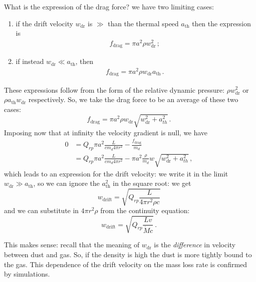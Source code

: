 \documentclass[main.tex]{subfiles}
\begin{document}
What is the expression of the drag force? we have two limiting cases: 
\begin{enumerate}
    \item if the drift velocity \(w _{\text{dr}}\) is \(\gg \) than the thermal speed \(a _{\text{th}}\) then the expression is 
    \begin{align}
    f _{\text{drag}} = \pi a^2 \rho w _{\text{dr}}^2
    \,;
    \end{align}
    \item if instead \(w _{\text{dr}} \ll a _{\text{th}}\), then 
    \begin{align}
    f _{\text{drag}}
    = \pi a^2 \rho w _{\text{dr}} a _{\text{th}}
    \,.
    \end{align}
\end{enumerate}

These expressions follow from the form of the relative dynamic pressure: \(\rho w^2 _{\text{dr}} \) or \(\rho a _{\text{th}} w _{\text{dr}}\) respectively.
So, we take the drag force to be an average of these two cases: 
%
\begin{equation}
f_{\text{drag}}=\pi a^2\rho w _{\text{dr}} \sqrt{w_{\text{dr}}^2+a_{th}^2}
\,.
\end{equation}
Imposing now that at infinity the velocity gradient is null, we have
\begin{align}
0&=Q_{rp}\pi a^2 \frac{L}{c m_d 4\pi r^2}-\frac{f_{\text{drag}}}{m_d} \\
&= Q_{rp}\pi a^2 \frac{L}{c m_d 4\pi r^2}
- \pi a^2 \frac{\rho}{m_d} w \sqrt{w_{\text{dr}}^2+a_{th}^2} \,,
\end{align}
%
which leads to an expression for the drift velocity: we write it in the limit \(w _{\text{dr}} \gg a _{\text{th}}\), so we can ignore the \(a^2 _{\text{th}}\) in the square root: we get
%
\begin{equation}
w_{\text{drift}}=\sqrt{Q_{rp}\frac{L}{4\pi r^2\rho c}}
\end{equation}
%
and we can substitute in \(4 \pi r^2 \rho \) from the continuity equation:
%
\begin{equation}
w_{\text{drift}}=\sqrt{Q_{rp}\frac{L v}{\dot M c}}\,.
\end{equation}

This makes sense: recall that the meaning of \(w _{\text{dr}}\) is the \emph{difference} in velocity between dust and gas. So, if the density is high the dust is more tightly bound to the gas.
This dependence of the drift velocity on the mass loss rate is confirmed by simulations.
\end{document}

